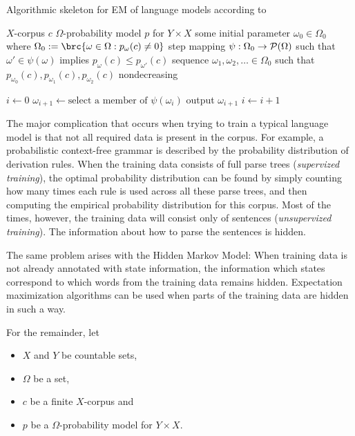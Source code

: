 \begin{algorithm}[t]
 \caption{Algorithmic skeleton for EM of language models according to \cite{bucstuvog15}}
 \label{alg:skeleton}
 \begin{algorithmic}[1]
  \algorithmheader[Input:] $X$-corpus $c$
  \algorithmheader         $\Omega$-probability model $p$ for $Y\times X$
  \algorithmheader         some initial parameter $\omega_0 \in \Omega_0$ where $\Omega_0 := \brc{\omega\in\Omega: p_\omega(c) \neq 0}$
  \algorithmheader[Implicit:] step mapping $\psi:\Omega_0\to\mathcal P(\Omega)$
  \algorithmheader            \hspace{1em} such that $\omega'\in\psi(\omega)$ implies $p_\omega(c) \leq p_{\omega'}(c)$
  \algorithmheader[Output:] sequence $\omega_1,\omega_2,\ldots\in\Omega_0$
  \algorithmheader            \hspace{1em} such that $p_{\omega_0}(c), p_{\omega_1}(c), p_{\omega_2}(c)$ nondecreasing

  \STATE $i\leftarrow 0$
   \STATE $\omega_{i+1} \leftarrow \text{select a member of $\psi(\omega_i)$}$
   \STATE output $\omega_{i+1}$
   \STATE $i\leftarrow i+1$
  \ENDWHILE
 \end{algorithmic}
\end{algorithm}

The major complication that occurs when trying to train a typical language
model is that not all required data is present in the corpus. For example, a
probabilistic context-free grammar is described by the probability distribution
of derivation rules. \cite{laryou90} When the training data consists of full
parse trees (\emph{supervized training}), the optimal probability distribution
can be found by simply counting how many times each rule is used across all
these parse trees, and then computing the empirical probability distribution
for this corpus. Most of the times, however, the training data will consist
only of sentences (\emph{unsupervized training}). The information about how to
parse the sentences is hidden.

The same problem arises with the Hidden Markov Model: When training data is not
already annotated with state information, the information which states
correspond to which words from the training data remains hidden. Expectation
maximization algorithms can be used when parts of the training data are hidden
in such a way.

For the remainder, let
\begin{itemize}\setlength\itemsep{-0.3em}
 \item $X$ and $Y$ be countable sets,
 \item $\Omega$ be a set,
 \item $c$ be a finite $X$-corpus and
 \item $p$ be a $\Omega$-probability model for $Y\times X$.
\end{itemize}

